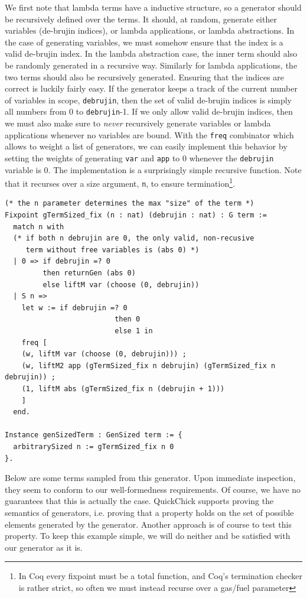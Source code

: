 \documentclass[twoside,11pt,openright]{report}
\newenvironment{code}{\captionsetup{type=figure, singlelinecheck=off, justification=raggedleft}}{}
\newcommand{\coq}[1]{\texttt{#1}}
\begin{document}
We first note that lambda terms have a inductive structure, so a generator should be recursively defined over the terms. It should, at random, generate either variables (de-brujin indices), or lambda applications, or lambda abstractions. In the case of generating variables, we must somehow ensure that the index is a valid de-brujin index. In the lambda abstraction case, the inner term should also be randomly generated in a recursive way. Similarly for lambda applications, the two terms should also be recursively generated. Ensuring that the indices are correct is luckily fairly easy. If the generator keeps a track of the current number of variables in scope, \coq{debrujin}, then the set of valid de-brujin indices is simply all numbers from 0 to \coq{debrujin}-1. If we only allow valid de-brujin indices, then we must also make sure to \textit{never} recursively generate variables or lambda applications whenever no variables are bound. With the \coq{freq} combinator which allows to weight a list of generators, we can easily implement this behavior by setting the weights of generating \coq{var} and \coq{app} to 0 whenever the \coq{debrujin} variable is 0. The implementation is a surprisingly simple recursive function. Note that it recurses over a size argument, \coq{n}, to ensure termination\footnote{In Coq every fixpoint must be a total function, and Coq's termination checker is rather strict, so often we must instead recurse over a gas/fuel parameter}.
\begin{code}
\begin{verbatim}
(* the n parameter determines the max "size" of the term *)
Fixpoint gTermSized_fix (n : nat) (debrujin : nat) : G term :=
  match n with
  (* if both n debrujin are 0, the only valid, non-recusive
     term without free variables is (abs 0) *)
  | 0 => if debrujin =? 0 
         then returnGen (abs 0)
         else liftM var (choose (0, debrujin))
  | S n => 
    let w := if debrujin =? 0
                          then 0
                          else 1 in 
    freq [
    (w, liftM var (choose (0, debrujin))) ;
    (w, liftM2 app (gTermSized_fix n debrujin) (gTermSized_fix n debrujin)) ;
    (1, liftM abs (gTermSized_fix n (debrujin + 1)))
    ]
  end.
 
Instance genSizedTerm : GenSized term := {
  arbitrarySized n := gTermSized_fix n 0
}.
\end{verbatim}
\end{code}
Below are some terms sampled from this generator. Upon immediate inspection, they seem to conform to our well-formedness requirements. Of course, we have no guarantees that this is actually the case. QuickChick supports proving the semantics of generators, i.e. proving that a property holds on the set of possible elements generated by the generator. Another approach is of course to test this property. To keep this example simple, we will do neither and be satisfied with our generator as it is.
\end{document}
